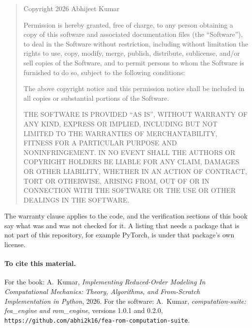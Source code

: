 \begin{quote}\small
Copyright \textcopyright{} 2026 Abhijeet Kumar

Permission is hereby granted, free of charge, to any person obtaining a copy of this software and associated documentation files (the ``Software''), to deal in the Software without restriction, including without limitation the rights to use, copy, modify, merge, publish, distribute, sublicense, and/or sell copies of the Software, and to permit persons to whom the Software is furnished to do so, subject to the following conditions:

The above copyright notice and this permission notice shall be included in all copies or substantial portions of the Software.

THE SOFTWARE IS PROVIDED ``AS IS'', WITHOUT WARRANTY OF ANY KIND, EXPRESS OR IMPLIED, INCLUDING BUT NOT LIMITED TO THE WARRANTIES OF MERCHANTABILITY, FITNESS FOR A PARTICULAR PURPOSE AND NONINFRINGEMENT. IN NO EVENT SHALL THE AUTHORS OR COPYRIGHT HOLDERS BE LIABLE FOR ANY CLAIM, DAMAGES OR OTHER LIABILITY, WHETHER IN AN ACTION OF CONTRACT, TORT OR OTHERWISE, ARISING FROM, OUT OF OR IN CONNECTION WITH THE SOFTWARE OR THE USE OR OTHER DEALINGS IN THE SOFTWARE.
\end{quote}

The warranty clause applies to the code, and the verification sections of this book say what was and was not checked for it. A listing that needs a package that is not part of this repository, for example PyTorch, is under that package's own license.

\paragraph{To cite this material.} For the book: A.~Kumar, \emph{Implementing Reduced-Order Modeling In Computational Mechanics: Theory, Algorithms, and From-Scratch Implementation in Python}, 2026. For the software: A.~Kumar, \emph{computation-suite: fea\_engine and rom\_engine}, versions 1.0.1 and 0.2.0, \texttt{https://github.com/abhi2k16/fea-rom-computation-suite}.
